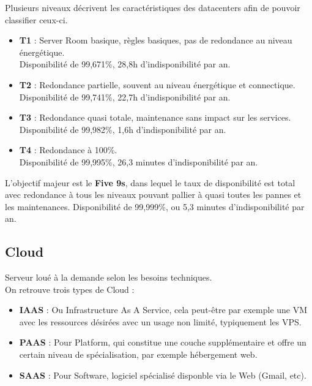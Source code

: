 \documentclass{report}
\begin{document}
			Plusieurs niveaux décrivent les caractéristiques des datacenters afin de pouvoir classifier ceux-ci.

			\begin{itemize}
				\item \textbf{T1} : Server Room basique, règles basiques, pas de redondance au niveau énergétique.\\
				Disponibilité de 99,671\%, 28,8h d'indisponibilité par an.\\
				\item \textbf{T2} : Redondance partielle, souvent au niveau énergétique et connectique.\\
				Disponibilité de 99,741\%, 22,7h d'indisponibilité par an.\\
				\item \textbf{T3} : Redondance quasi totale, maintenance sans impact sur les services.\\
				Disponibilité de 99,982\%, 1,6h d'indisponibilité par an.\\
				\item \textbf{T4} : Redondance à 100\%.\\
				Disponibilité de 99,995\%, 26,3 minutes d'indisponibilité par an.\\
			\end{itemize}

			L'objectif majeur est le \textbf{Five 9s}, dans lequel le taux de disponibilité est total avec redondance à tous les niveaux pouvant pallier à quasi toutes les pannes et les maintenances. Disponibilité de 99,999\%, ou 5,3 minutes d'indisponibilité par an.\\

		\subsection{Cloud}

			Serveur loué à la demande selon les besoins techniques.\\
			On retrouve trois types de Cloud : \\

			\begin{itemize}
				\item \textbf{IAAS} : Ou Infrastructure As A Service, cela peut-être par exemple une VM avec les ressources désirées avec un usage non limité, typiquement les VPS.\\
				\item \textbf{PAAS} : Pour Platform, qui constitue une couche supplémentaire et offre un certain niveau de spécialisation, par exemple hébergement web.\\
				\item \textbf{SAAS} : Pour Software, logiciel spécialisé disponble via le Web (Gmail, etc).\\
			\end{itemize}
\end{document}
